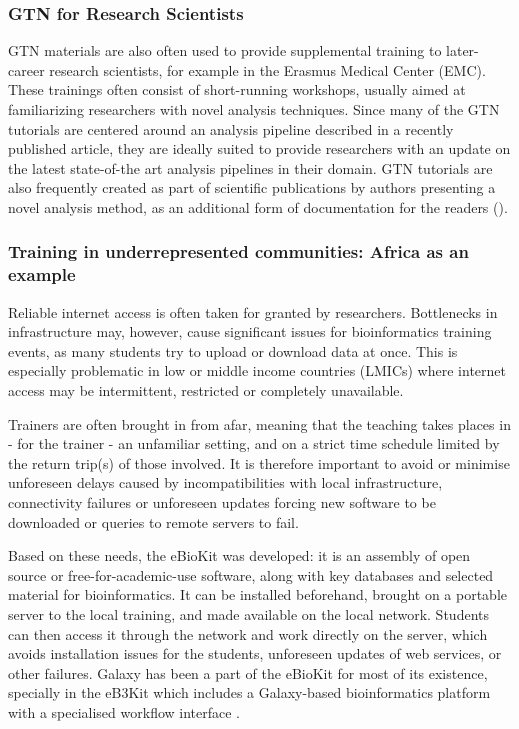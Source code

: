 \documentclass[10pt,letterpaper]{article}
\begin{document}
\subsubsection*{GTN for Research Scientists}

GTN materials are also often used to provide supplemental training to later-career research scientists, for example in the Erasmus Medical Center (EMC). These trainings often consist of short-running workshops, usually aimed at familiarizing researchers with novel analysis techniques. Since many of the GTN tutorials are centered around an analysis pipeline described in a recently published article, they are ideally suited to provide researchers with an update on the latest state-of-the art analysis pipelines in their domain. 
GTN tutorials are also frequently created as part of scientific publications by authors presenting a novel analysis method, as an additional form of documentation for the readers (\cite{Mehta2021, deKoning2020, Tekman2020}).

\subsubsection*{Training in underrepresented communities: Africa as an example}

Reliable internet access is often taken for granted by researchers. Bottlenecks in infrastructure may, however, cause significant issues for bioinformatics training events, as many students try to upload or download data at once. This is especially problematic in low or middle income countries (LMICs) where internet access may be intermittent, restricted or completely unavailable.

Trainers are often brought in from afar, meaning that the teaching takes places in - for the trainer - an unfamiliar setting, and on a strict time schedule limited by the return trip(s) of those involved. It is therefore important to avoid or minimise unforeseen delays caused by incompatibilities with local infrastructure, connectivity failures or unforeseen updates forcing new software to be downloaded or queries to remote servers to fail.

Based on these needs, the eBioKit \cite{Hernandez2017} was developed: it is an assembly of open source or free-for-academic-use software, along with key databases and selected material for bioinformatics. It can be installed beforehand, brought on a portable server to the local training, and made available on the local network. Students can then access it through the network and work directly on the server, which avoids installation issues for the students, unforeseen updates of web services, or other failures. Galaxy has been a part of the eBioKit for most of its existence, specially in the eB3Kit which includes a Galaxy-based bioinformatics platform with a specialised workflow interface \cite{Klingstrom_2017}. %
\end{document}

